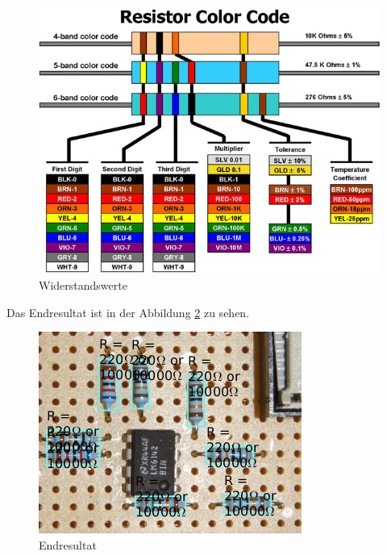 \begin{figure}[t]
    \centering
    \includegraphics[width=\linewidth]{images/resistorchart}
    \caption{Widerstandswerte\cite{ref:resistorcodes}}
    \label{fig:resistorchart}
\end{figure}

Das Endresultat ist in der Abbildung \ref{fig:10} zu sehen.

\begin{figure}[t]
    \centering
    \includegraphics[width=.8\linewidth]{images/10}
    \caption{Endresultat}
    \label{fig:10}
\end{figure}

